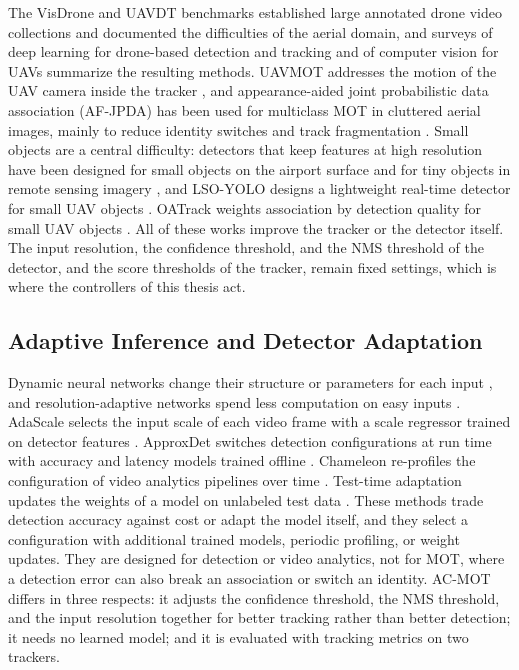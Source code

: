 The VisDrone \cite{zhu2022visdrone} and UAVDT \cite{du2018uavdt} benchmarks established large annotated drone video collections and documented the difficulties of the aerial domain, and surveys of deep learning for drone-based detection and tracking \cite{wu2022uavsurvey} and of computer vision for UAVs \cite{kanellakis2017uavvision} summarize the resulting methods. UAVMOT addresses the motion of the UAV camera inside the tracker \cite{liu2022uavmot}, and appearance-aided joint probabilistic data association (AF-JPDA) has been used for multiclass MOT in cluttered aerial images, mainly to reduce identity switches and track fragmentation \cite{kim2024afjpda}. Small objects are a central difficulty: detectors that keep features at high resolution have been designed for small objects on the airport surface \cite{huang2022airportsmall} and for tiny objects in remote sensing imagery \cite{fathy2026toren}, and LSO-YOLO designs a lightweight real-time detector for small UAV objects \cite{dai2026lsoyolo}. OATrack weights association by detection quality for small UAV objects \cite{qi2026oatrack}. All of these works improve the tracker or the detector itself. The input resolution, the confidence threshold, and the NMS threshold of the detector, and the score thresholds of the tracker, remain fixed settings, which is where the controllers of this thesis act.

\subsection{Adaptive Inference and Detector Adaptation}\label{sec:rw-inference}
Dynamic neural networks change their structure or parameters for each input \cite{han2022dynamic}, and resolution-adaptive networks spend less computation on easy inputs \cite{yang2020ranet}. AdaScale selects the input scale of each video frame with a scale regressor trained on detector features \cite{chin2019adascale}. ApproxDet switches detection configurations at run time with accuracy and latency models trained offline \cite{xu2020approxdet}. Chameleon re-profiles the configuration of video analytics pipelines over time \cite{jiang2018chameleon}. Test-time adaptation updates the weights of a model on unlabeled test data \cite{wang2021tent}. These methods trade detection accuracy against cost or adapt the model itself, and they select a configuration with additional trained models, periodic profiling, or weight updates. They are designed for detection or video analytics, not for MOT, where a detection error can also break an association or switch an identity. AC-MOT differs in three respects: it adjusts the confidence threshold, the NMS threshold, and the input resolution together for better tracking rather than better detection; it needs no learned model; and it is evaluated with tracking metrics on two trackers.

